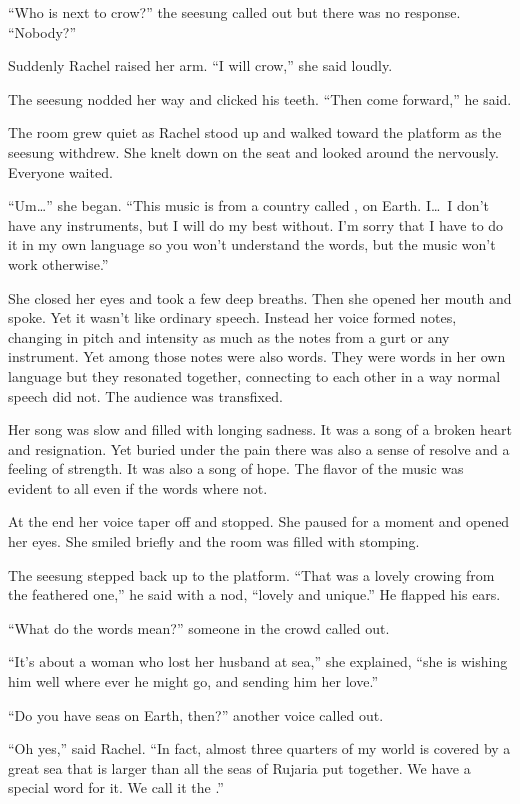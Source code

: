 ``Who is next to crow?'' the seesung called out but there was no response. ``Nobody?''

Suddenly Rachel raised her arm. ``I will crow,'' she said loudly.

The seesung nodded her way and clicked his teeth. ``Then come forward,'' he said.

The room grew quiet as Rachel stood up and walked toward the platform as the seesung withdrew.
She knelt down on the seat and looked around the nervously. Everyone waited.

``Um\ldots'' she began. ``This music is from a country called , on Earth.
I\ldots\ I don't have any instruments, but I will do my best without. I'm sorry that I have to
do it in my own language so you won't understand the words, but the music won't work
otherwise.''

She closed her eyes and took a few deep breaths. Then she opened her mouth and spoke. Yet it
wasn't like ordinary speech. Instead her voice formed notes, changing in pitch and intensity as
much as the notes from a gurt or any instrument. Yet among those notes were also words. They
were words in her own language but they resonated together, connecting to each other in a way
normal speech did not. The audience was transfixed.

Her song was slow and filled with longing sadness. It was a song of a broken heart and
resignation. Yet buried under the pain there was also a sense of resolve and a feeling of
strength. It was also a song of hope. The flavor of the music was evident to all even if the
words where not.

At the end her voice taper off and stopped. She paused for a moment and opened her eyes. She
smiled briefly and the room was filled with stomping.

The seesung stepped back up to the platform. ``That was a lovely crowing from the feathered
one,'' he said with a nod, ``lovely and unique.'' He flapped his ears.

``What do the words mean?'' someone in the crowd called out.

``It's about a woman who lost her husband at sea,'' she explained, ``she is wishing him well
where ever he might go, and sending him her love.''

``Do you have seas on Earth, then?'' another voice called out.

``Oh yes,'' said Rachel. ``In fact, almost three quarters of my world is covered by a great sea
that is larger than all the seas of Rujaria put together. We have a special word for it. We call
it the .''


